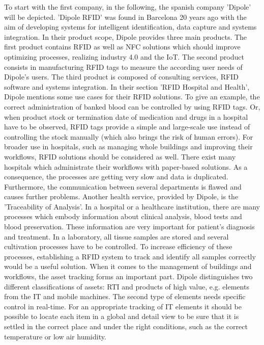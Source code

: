 To start with the first company, in the following, the spanish company 'Dipole' \cite{dipole} will be depicted. 'Dipole RFID' was found in Barcelona 20 years ago with the aim of developing systems for intelligent identification, data capture and systems integration. In their product scope, Dipole provides three main products. The first product contains RFID as well as \ac{NFC} solutions which should improve optimizing processes, realizing industry 4.0 and the \ac{IoT}. The second product consists in manufacturing RFID tags to measure the according user needs of Dipole's users. The third product is composed of consulting services, RFID software and systems integration.
In their section 'RFID Hospital and Health', Dipole mentions some use cases for their RFID solutions. To give an example, the correct administration of banked blood can be controlled by using RFID tags. Or, when product stock or termination date of medication and drugs in a hospital have to be observed, RFID tags provide a simple and large-scale use instead of controlling the stock manually (which also brings the risk of human errors). For broader use in hospitals, such as managing whole buildings and improving their workflows, RFID solutions should be considered as well. There exist many hospitals which administrate their workflows with paper-based solutions. As a consequence, the processes are getting very slow and data is duplicated. Furthermore, the communication between several departments is flawed and causes further problems.
Another health service, provided by Dipole, is the 'Traceability of Analysis'. In a hospital or a healthcare institution, there are many processes which embody information about clinical analysis, blood tests and blood preservation. These information are very important for patient's diagnosis and treatment. In a laboratory, all tissue samples are stored and several cultivation processes have to be controlled. To increase efficiency of these processes, establishing a RFID system to track and identify all samples correctly would be a useful solution.
When it comes to the management of buildings and workflows, the asset tracking forms an important part. Dipole distinguishes two different classifications of assets: \ac{RTI} and products of high value, e.g. elements from the IT and mobile machines. The second type of elements needs specific control in real-time. For an appropriate tracking of IT elements it should be possible to locate each item in a global and detail view to be sure that it is settled in the correct place and under the right conditions, such as the correct temperature or low air humidity.
